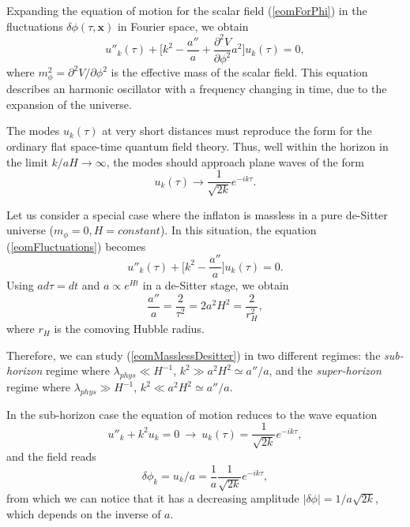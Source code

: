 \documentclass[11pt,a4paper,twoside]{book}
\begin{document}
Expanding the equation of motion for the scalar field (\ref{eomForPhi}) in the fluctuations $\delta\phi(\tau,\textbf{x})$ in Fourier space, we obtain
\begin{equation}
	\label{eomFluctuations}
	u''_{k}(\tau) + \Big[k^{2} - \frac{a''}{a} + \frac{\partial^{2} V}{\partial\phi^{2}}a^{2}\Big] u_{k}(\tau) = 0,
\end{equation}
 where $ m^{2}_{\phi} = \partial^{2} V / \partial\phi^{2} $ is the effective mass of the scalar field. This equation describes an harmonic oscillator with a frequency changing in time, due to the expansion of the universe.
 
 The modes $ u_{k}(\tau) $ at very short distances must reproduce the form for the ordinary flat space-time quantum field theory. Thus, well within the horizon in the limit $ k/aH \rightarrow \infty $, the modes should approach plane waves of the form
 \begin{equation}
 	\label{planeWave}
 	u_{k}(\tau) \rightarrow \frac{1}{\sqrt{2k}}e^{-ik\tau}.
 \end{equation}

Let us consider a special case where the inflaton is massless in a pure de-Sitter universe ($m_{\phi} = 0, H=constant $). In this situation, the equation (\ref{eomFluctuations}) becomes
\begin{equation}
\label{eomMasslessDesitter}
u''_{k}(\tau) + \Big[k^{2} - \frac{a''}{a}\Big]u_{k}(\tau) = 0.
\end{equation}
Using $a d\tau=dt$ and $ a \propto e^{Ht}$ in a de-Sitter stage, we obtain 
\begin{equation}
	\label{horizon}
	\frac{a''}{a}= \frac{2}{\tau^{2}}=2a^{2}H^{2}=\frac{2}{r_{H}^{2}},
\end{equation}
where $ r_{H} $ is the comoving Hubble radius.

Therefore, we can study (\ref{eomMasslessDesitter}) in two different regimes: the \textit{sub-horizon} regime where $ \lambda_{phys} \ll H^{-1} $, $ k^{2} \gg a^{2}H^{2} \simeq a''/a $, and the \textit{super-horizon} regime where $ \lambda_{phys} \gg H^{-1} $, $ k^{2} \ll a^{2}H^{2} \simeq a''/a $.

In the sub-horizon case the equation of motion reduces to the wave equation
\begin{equation}
\label{waveEquationFluctuation}
u''_{k} + k^{2}u_{k}=0\  \rightarrow\  u_{k}(\tau)= \frac{1}{\sqrt{2k}}e^{-ik\tau} ,
\end{equation}
and the field reads
\begin{equation}
	\label{fieldSubHorizon}
	 \delta\phi_{k}=u_{k}/a=\frac{1}{a}\frac{1}{\sqrt{2k}}e^{-ik\tau},
\end{equation}
from which we can notice that it has a decreasing amplitude $ |\delta\phi| = 1/a\sqrt{2k} $, which depends on the inverse of $ a $.
\end{document}
